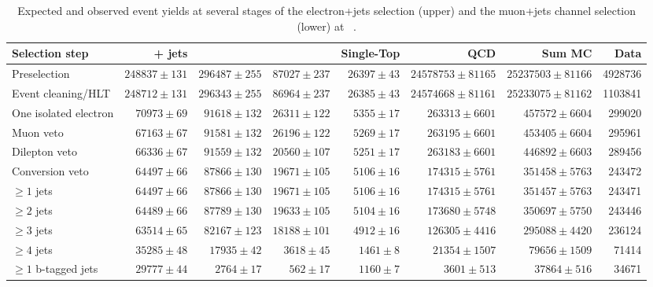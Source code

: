 \begin{table}
  \centering
   \caption{Expected and observed event yields at several stages of the electron+jets selection (upper) and
   the muon+jets channel selection (lower) at ~\TeV.}
    \label{tab:cut_flow_7TeV}
    \resizebox{\columnwidth}{!} {
    \begin{tabular}{lrrrrrrr}
    \hline
    \hline
	Selection step & \ttbar + jets & \WpJets & \ZpJets & Single-Top & QCD & Sum MC & Data \\
	\hline
	Preselection  &  $248837 \pm 131$ &  $296487 \pm 255$ &  $87027 \pm 237$ &  $26397 \pm 43$ &  $24578753 \pm 81165$ &  $25237503 \pm 81166$ &  4928736 \\ 
	Event cleaning/HLT  &  $248712 \pm 131$ &  $296343 \pm 255$ &  $86964 \pm 237$ &  $26385 \pm 43$ &  $24574668 \pm 81161$ &  $25233075 \pm 81162$ &  1103841 \\ 
	One isolated electron  &  $70973 \pm 69$ &  $91618 \pm 132$ &  $26311 \pm 122$ &  $5355 \pm 17$ &  $263313 \pm 6601$ &  $457572 \pm 6604$ &  299020 \\ 
	Muon veto  &  $67163 \pm 67$ &  $91581 \pm 132$ &  $26196 \pm 122$ &  $5269 \pm 17$ &  $263195 \pm 6601$ &  $453405 \pm 6604$ &  295961 \\ 
	Dilepton veto  &  $66336 \pm 67$ &  $91559 \pm 132$ &  $20560 \pm 107$ &  $5251 \pm 17$ &  $263183 \pm 6601$ &  $446892 \pm 6603$ &  289456 \\ 
	Conversion veto  &  $64497 \pm 66$ &  $87866 \pm 130$ &  $19671 \pm 105$ &  $5106 \pm 16$ &  $174315 \pm 5761$ &  $351458 \pm 5763$ &  243472 \\ 
	$\geq 1$ jets  &  $64497 \pm 66$ &  $87866 \pm 130$ &  $19671 \pm 105$ &  $5106 \pm 16$ &  $174315 \pm 5761$ &  $351457 \pm 5763$ &  243471 \\ 
	$\geq 2$ jets  &  $64489 \pm 66$ &  $87789 \pm 130$ &  $19633 \pm 105$ &  $5104 \pm 16$ &  $173680 \pm 5748$ &  $350697 \pm 5750$ &  243446 \\ 
	$\geq 3$ jets  &  $63514 \pm 65$ &  $82167 \pm 123$ &  $18188 \pm 101$ &  $4912 \pm 16$ &  $126305 \pm 4416$ &  $295088 \pm 4420$ &  236124 \\ 
	$\geq 4$ jets  &  $35285 \pm 48$ &  $17935 \pm 42$ &  $3618 \pm 45$ &  $1461 \pm 8$ &  $21354 \pm 1507$ &  $79656 \pm 1509$ &  71414 \\ 
	$\geq 1$ b-tagged jets  &  $29777 \pm 44$ &  $2764 \pm 17$ &  $562 \pm 17$ &  $1160 \pm 7$ &  $3601 \pm 513$ &  $37864 \pm 516$ &  34671 \\ 

\end{tabular}}
\end{table}

